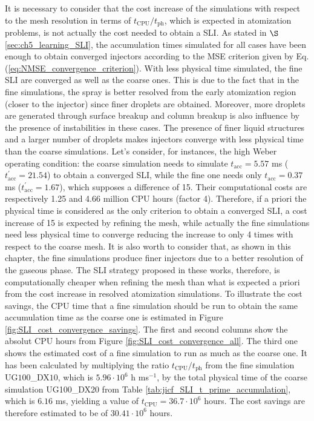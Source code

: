 It is necessary to consider that the cost increase of the simulations with respect to the mesh resolution in terms of $t_\mathrm{CPU}/t_\mathrm{ph}$, which is expected in atomization problems, is not actually the cost needed to obtain a SLI. As stated in $\S$\ref{sec:ch5_learning_SLI}, the accumulation times simulated for all cases have been enough to obtain converged injectors according to the MSE criterion given by Eq. (\ref{eq:NMSE_convergence_criterion}). With less physical time simulated, the fine SLI are converged as well as the coarse ones. This is due to the fact that in the fine simulations, the spray is better resolved from the early atomization region (closer to the injector) since finer droplets are obtained. Moreover,  more droplets are generated through surface breakup and column breakup is also influence by the presence of instabilities in these cases. The presence of finer liquid structures and a larger number of droplets makes injectors converge with less physical time than the coarse simulations. Let's consider, for instances, the high Weber operating condition: the coarse simulation needs to simulate $t_\mathrm{acc} = 5.57$ ms ($t^\prime_\mathrm{acc} = 21.54$) to obtain a converged SLI, while the fine one needs only $t_\mathrm{acc} = 0.37$ ms ($t^\prime_\mathrm{acc} = 1.67$), which supposes a difference of 15. Their computational costs are respectively 1.25 and 4.66 million CPU hours (factor 4). Therefore, if a priori the physical time is considered as the only criterion to obtain a converged SLI, a cost increase of 15 is expected by refining the mesh, while actually the fine simulations need less physical time to converge reducing the increase to only 4 times with respect to the coarse mesh. It is also worth to consider that, as shown in this chapter, the fine simulations produce finer injectors due to a better resolution of the gaseous phase. The SLI strategy proposed in these works, therefore, is computationally cheaper when refining the mesh than what is expected a priori from the cost increase in resolved atomization simulations. To illustrate the cost savings, the CPU time that a fine simulation should be run to obtain the same accumulation time as the coarse one is estimated in Figure \ref{fig:SLI_cost_convergence_savings}. The first and second columns show the absolut CPU hours from Figure \ref{fig:SLI_cost_convergence_all}. The third one shows the estimated cost of a fine simulation to run as much as the coarse one. It has been calculated by multiplying the ratio $t_\mathrm{CPU}/t_\mathrm{ph}$ from the fine simulation UG$100$\_DX$10$, which is $5.96 \cdot 10^6$ h ms$^{-1}$, by the total physical time of the coarse simulation UG100\_DX20 from Table \ref{tab:jicf_SLI_t_prime_accumulation}, which is $6.16$ ms, yielding a value of $t_\mathrm{CPU} = 36.7 \cdot 10^6$ hours. The cost savings are therefore estimated to be of $30.41 \cdot 10^6$ hours.

